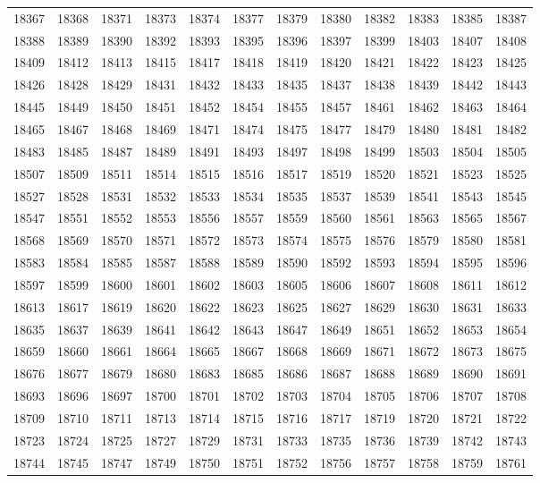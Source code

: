 \begin{center}
\begin{longtable}{llllllllllll}
18367 &18368 &18371 &18373 &18374 &18377 &18379 &18380 &18382 &18383 &18385 &18387 \\
18388 &18389 &18390 &18392 &18393 &18395 &18396 &18397 &18399 &18403 &18407 &18408 \\
18409 &18412 &18413 &18415 &18417 &18418 &18419 &18420 &18421 &18422 &18423 &18425 \\
18426 &18428 &18429 &18431 &18432 &18433 &18435 &18437 &18438 &18439 &18442 &18443 \\
18445 &18449 &18450 &18451 &18452 &18454 &18455 &18457 &18461 &18462 &18463 &18464 \\
18465 &18467 &18468 &18469 &18471 &18474 &18475 &18477 &18479 &18480 &18481 &18482 \\
18483 &18485 &18487 &18489 &18491 &18493 &18497 &18498 &18499 &18503 &18504 &18505 \\
18507 &18509 &18511 &18514 &18515 &18516 &18517 &18519 &18520 &18521 &18523 &18525 \\
18527 &18528 &18531 &18532 &18533 &18534 &18535 &18537 &18539 &18541 &18543 &18545 \\
18547 &18551 &18552 &18553 &18556 &18557 &18559 &18560 &18561 &18563 &18565 &18567 \\
18568 &18569 &18570 &18571 &18572 &18573 &18574 &18575 &18576 &18579 &18580 &18581 \\
18583 &18584 &18585 &18587 &18588 &18589 &18590 &18592 &18593 &18594 &18595 &18596 \\
18597 &18599 &18600 &18601 &18602 &18603 &18605 &18606 &18607 &18608 &18611 &18612 \\
18613 &18617 &18619 &18620 &18622 &18623 &18625 &18627 &18629 &18630 &18631 &18633 \\
18635 &18637 &18639 &18641 &18642 &18643 &18647 &18649 &18651 &18652 &18653 &18654 \\
18659 &18660 &18661 &18664 &18665 &18667 &18668 &18669 &18671 &18672 &18673 &18675 \\
18676 &18677 &18679 &18680 &18683 &18685 &18686 &18687 &18688 &18689 &18690 &18691 \\
18693 &18696 &18697 &18700 &18701 &18702 &18703 &18704 &18705 &18706 &18707 &18708 \\
18709 &18710 &18711 &18713 &18714 &18715 &18716 &18717 &18719 &18720 &18721 &18722 \\
18723 &18724 &18725 &18727 &18729 &18731 &18733 &18735 &18736 &18739 &18742 &18743 \\
18744 &18745 &18747 &18749 &18750 &18751 &18752 &18756 &18757 &18758 &18759 &18761 \\

\end{longtable}
\end{center}

